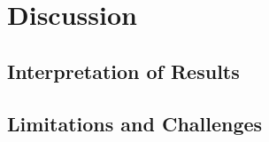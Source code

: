 \chapter{Discussion}
\label{chap:kapitel6}


	\section{Interpretation of Results}
	\label{sec:interpretation-of-results}
	
	
	
	\section{Limitations and Challenges}
	\label{sec:limitations-and-challenges}
	
	
	
	
	
	
	
	